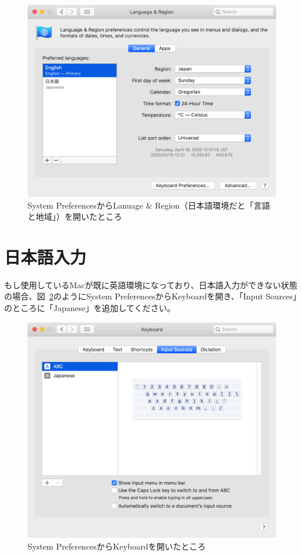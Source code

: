 \begin{figure}
  \centering
  \includegraphics[scale=0.35]{fig/SystemPreferences_language.png}
  \caption{System PreferencesからLanuage \& Region（日本語環境だと「言語と地域」）を開いたところ}
  \label{fig:SystemPreferences_language}
\end{figure}

\section{日本語入力}

もし使用しているMacが既に英語環境になっており、日本語入力ができない状態の場合、図~\ref{fig:SystemPreferences_input}のようにSystem PreferencesからKeyboardを開き、「Input Sources」のところに「Japanese」を追加してください。

\begin{figure}
  \centering
  \includegraphics[scale=0.35]{fig/SystemPreferences_input.png}
  \caption{System PreferencesからKeyboardを開いたところ}
  \label{fig:SystemPreferences_input}
\end{figure}

